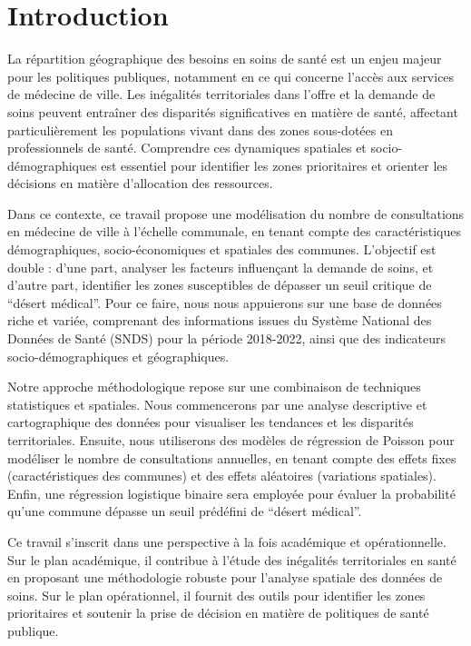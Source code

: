 \section{Introduction}\label{introduction}

La répartition géographique des besoins en soins de santé est un enjeu
majeur pour les politiques publiques, notamment en ce qui concerne
l'accès aux services de médecine de ville. Les inégalités territoriales
dans l'offre et la demande de soins peuvent entraîner des disparités
significatives en matière de santé, affectant particulièrement les
populations vivant dans des zones sous-dotées en professionnels de
santé. Comprendre ces dynamiques spatiales et socio-démographiques est
essentiel pour identifier les zones prioritaires et orienter les
décisions en matière d'allocation des ressources.

Dans ce contexte, ce travail propose une modélisation du nombre de
consultations en médecine de ville à l'échelle communale, en tenant
compte des caractéristiques démographiques, socio-économiques et
spatiales des communes. L'objectif est double : d'une part, analyser les
facteurs influençant la demande de soins, et d'autre part, identifier
les zones susceptibles de dépasser un seuil critique de ``désert
médical''. Pour ce faire, nous nous appuierons sur une base de données
riche et variée, comprenant des informations issues du Système National
des Données de Santé (SNDS) pour la période 2018-2022, ainsi que des
indicateurs socio-démographiques et géographiques.

Notre approche méthodologique repose sur une combinaison de techniques
statistiques et spatiales. Nous commencerons par une analyse descriptive
et cartographique des données pour visualiser les tendances et les
disparités territoriales. Ensuite, nous utiliserons des modèles de
régression de Poisson pour modéliser le nombre de consultations
annuelles, en tenant compte des effets fixes (caractéristiques des
communes) et des effets aléatoires (variations spatiales). Enfin, une
régression logistique binaire sera employée pour évaluer la probabilité
qu'une commune dépasse un seuil prédéfini de ``désert médical''.

Ce travail s'inscrit dans une perspective à la fois académique et
opérationnelle. Sur le plan académique, il contribue à l'étude des
inégalités territoriales en santé en proposant une méthodologie robuste
pour l'analyse spatiale des données de soins. Sur le plan opérationnel,
il fournit des outils pour identifier les zones prioritaires et soutenir
la prise de décision en matière de politiques de santé publique.
